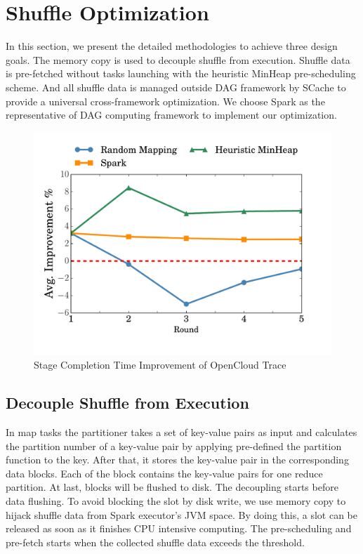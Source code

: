 \section{Shuffle Optimization}
In this section, we present the detailed methodologies to achieve three design goals. The memory copy is used to decouple shuffle from execution. Shuffle data is pre-fetched without tasks launching with the heuristic MinHeap pre-scheduling scheme. And all shuffle data is managed outside DAG framework by SCache to provide a universal cross-framework optimization.
We choose Spark \cite{apachespark} as the representative of DAG computing framework to implement our optimization.

\begin{figure}
	\centering
	\includegraphics[width=0.9\linewidth]{fig/sim}
	\caption{Stage Completion Time Improvement of OpenCloud Trace}
	\label{fig:sim}
\end{figure}

\subsection{Decouple Shuffle from Execution}
In map tasks the partitioner takes a set of key-value pairs as input and calculates the partition number of a key-value pair by applying pre-defined the partition function to the key. After that, it stores the key-value pair in the corresponding data blocks. Each of the block contains the key-value pairs for one reduce partition. At last, blocks will be flushed to disk. The decoupling starts before data flushing. To avoid blocking the slot by disk write, we use memory copy to hijack shuffle data from Spark executor's JVM space. By doing this, a slot can be released as soon as it finishes CPU intensive computing. The pre-scheduling and pre-fetch starts when the collected shuffle data exceeds the threshold.

